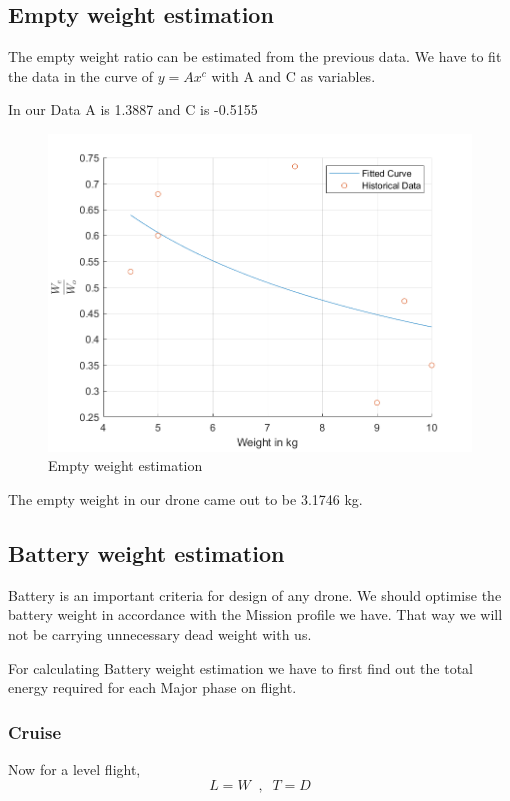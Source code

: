 \documentclass[12 pt]{article}
\begin{document}
\hfill


\subsection{Empty weight estimation}
The empty weight ratio can be estimated from the previous data. We have to fit the data in the curve of $y = A x^c$ with A and C as variables.

In our Data A is 1.3887 and C is -0.5155

\begin{figure}[h]
    \centering
    \includegraphics[width = 0.8\linewidth]{Codes/Week 2/Empty_weight.png}
    \caption{Empty weight estimation}
    \label{Empty Weight estimation}
\end{figure}

The empty weight in our drone came out to be 3.1746 kg.

\newpage

\subsection{Battery weight estimation}

Battery is an important criteria for design of any drone. We should optimise the battery weight in accordance with the Mission profile we have. That way we will not be carrying unnecessary dead weight with us.

For calculating Battery weight estimation we have to first find out the total energy required for each Major phase on flight.

\subsubsection{Cruise}
Now for a level flight,
$$ L = W \; \; , \; \; T = D$$
\end{document}
